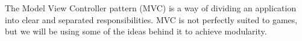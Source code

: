 The Model View Controller pattern (MVC) is a way of dividing an application
into clear and separated responsibilities. MVC is not perfectly suited to 
games, but we will be using some of the ideas behind it to achieve modularity.

